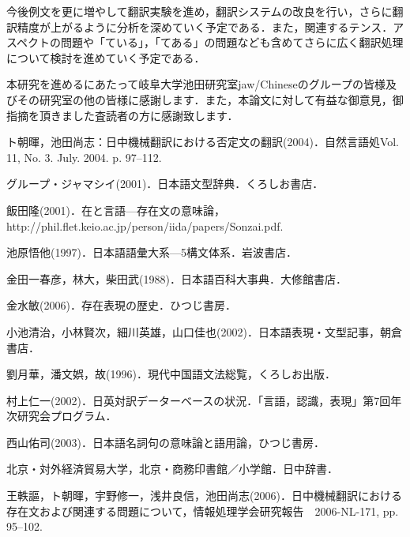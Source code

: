 \documentclass[japanese]{jnlp_1.4}
\begin{document}
今後例文を更に増やして翻訳実験を進め，翻訳システムの改良を行い，さらに翻訳精度が上がるように分析を深めていく予定である．また，関連するテンス．アスペクトの問題や「ている」，「てある」の問題なども含めてさらに広く翻訳処理について検討を進めていく予定である．


\acknowledgment

本研究を進めるにあたって岐阜大学池田研究室jaw/Chineseのグループの皆様及びその研究室の他の皆様に感謝します．また，本論文に対して有益な御意見，御指摘を頂きました査読者の方に感謝致します．


\begin{thebibliography}{3}


\item
ト朝暉，池田尚志：日中機械翻訳における否定文の翻訳(2004)．自然言語処Vol. 11, No. 3. July. 2004. p. 97--112.

\item
グループ・ジャマシイ(2001)．日本語文型辞典．くろしお書店．

\item
飯田隆(2001)．在と言語—存在文の意味論，http://phil.flet.keio.ac.jp/person/iida/papers/Sonzai.pdf.

\item
池原悟他(1997)．日本語語彙大系—5構文体系．岩波書店．

\item
金田一春彦，林大，柴田武(1988)．日本語百科大事典．大修館書店．

\item
金水敏(2006)．存在表現の歴史．ひつじ書房．

\item
小池清治，小林賢次，細川英雄，山口佳也(2002)．日本語表現・文型記事，朝倉書店．

\item
劉月華，潘文娯，故(1996)．現代中国語文法総覧，くろしお出版．

\item
村上仁一(2002)．日英対訳データーベースの状況．「言語，認識，表現」第7回年次研究会プログラム．

\item
西山佑司(2003)．日本語名詞句の意味論と語用論，ひつじ書房．

\item
北京・対外経済貿易大学，北京・商務印書館／小学館．日中辞書．

\item
王軼謳，ト朝暉，宇野修一，浅井良信，池田尚志(2006)．日中機械翻訳における存在文および関連する問題について，情報処理学会研究報告　2006-NL-171, pp. 95--102.


\end{thebibliography}
\end{document}
